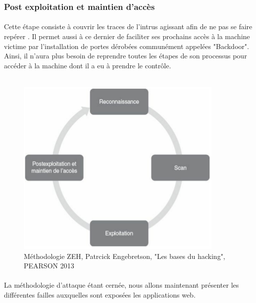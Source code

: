 	  \subsubsection{Post exploitation et maintien d’accès}
	    \paragraph{}
	      Cette étape consiste à couvrir les traces de l'intrus agissant afin de ne pas se faire repérer \cite{E}. Il permet aussi à ce dernier de faciliter ses prochains accès à la machine victime par l'installation de portes dérobées communément appelées "Backdoor". Ainsi, il n'aura plus besoin de reprendre toutes les étapes de son processus pour accéder à la machine dont il a eu \`a prendre le contrôle.\\ \\
	      

	\begin{figure}[H]
	  \begin{center}
	    \includegraphics[scale=0.5]{images/zeh_cycle.png}
	  \end{center}
	  \caption[Représentation cyclique de la méthodologie ZEH.]
	    {Méthodologie ZEH, Patrcick Engebretson, "Les bases du hacking", PEARSON 2013}
	    \label{Methodologie d'intrusion}
	\end{figure}


	\paragraph{}
	  La méthodologie d'attaque étant cernée, nous allons maintenant présenter les différentes failles auxquelles sont expos\'ees les applications web.	    
			    

